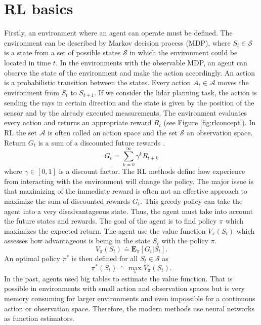 \section{RL basics}
Firstly, an environment where an agent can operate must be defined. The environment can be described by Markov decision process (MDP), where $S_t \in \mathcal{S}$ is a state from a set of possible states $\mathcal{S}$ in which the environment could be located in time $t$. In the environments with the observable MDP, an agent can observe the state of the environment and make the action accordingly. An action is a probabilistic transition between the states. Every action $A_t \in \mathcal{A}$ moves the environment from $S_t$ to $S_{t+1}$. If we consider the lidar planning task, the action is sending the rays in certain direction and the state is given by the position of the sensor and by the already executed measurements. The environment evaluates every action and returns an appropriate reward $R_t$ (see Figure \ref{fig:rlconcept}). In RL the set $\mathcal{A}$ is often called an action space and the set $\mathcal{S}$ an observation space. Return $G_t$ is a sum of a discounted future rewards \cite{sutton2012}.
\begin{equation}
G_t = \sum\limits_{k=0}^{\infty}\gamma^k R_{t+k}
\end{equation}
where $\gamma \in [0,1]$ is a discount factor. The RL methods define how experience from interacting with the environment will change the policy. The major issue is that maximizing of the immediate reward is often not an effective approach to maximize the sum of discounted rewards $G_t$. This greedy policy can take the agent into a very disadvantageous state. Thus, the agent must take into account the future states and rewards. The goal of the agent is to find policy $\pi$ which maximizes the expected return. The agent use the value function $V_{\pi}(S_t)$ which assesses how advantageous is being in the state $S_t$ with the policy $\pi$.
\begin{equation}
V_{\pi}(S_t) \doteq  \mathbf{E}_\pi[G_t | S_t].
\end{equation}
An optimal policy $\pi^*$ is then defined for all $S_t \in \mathcal{S}$ as
\begin{equation}
\pi^*(S_t) \doteq \max\limits_\pi V_\pi(S_t).
\end{equation}
In the past, agents used big tables to estimate the value function. That is possible in environments with small action and observation spaces but is very memory consuming for larger environments and even impossible for a continuous action or observation space. Therefore, the modern methods use neural networks as function estimators.

